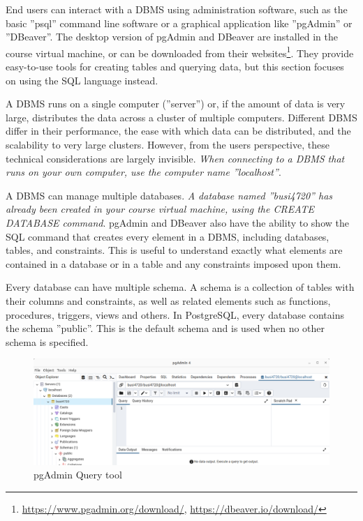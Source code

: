 End users can interact with a DBMS using administration software, such as the basic ''psql'' command line software or a graphical application like ''pgAdmin'' or ''DBeaver''. The desktop version of pgAdmin and DBeaver are installed in the course virtual machine, or can be downloaded from their websites\footnote{\url{https://www.pgadmin.org/download/}, \url{https://dbeaver.io/download/}}. They provide easy-to-use tools for creating tables and querying data, but this section focuses on using the SQL language instead.

A DBMS runs on a single computer (''server'') or, if the amount of data is very large, distributes the data across a cluster of multiple computers. Different DBMS differ in their performance, the ease with which data can be distributed, and the scalability to very large clusters. However, from the users perspective, these technical considerations are largely invisible. \emph{When connecting to a DBMS that runs on your own computer, use the computer name ''localhost''}.

A DBMS can manage multiple databases. \emph{A database named ''busi4720'' has already been created in your course virtual machine, using the CREATE DATABASE command}. pgAdmin and DBeaver also have the ability to show the SQL command that creates every element in a DBMS, including databases, tables, and constraints. This is useful to understand exactly what elements are contained in a database or in a table and any constraints imposed upon them.

Every database can have multiple schema. A schema is a collection of tables with their columns and constraints, as well as related elements such as functions, procedures, triggers, views and others. In PostgreSQL, every database contains the schema ''public''. This is the default schema and is used when no other schema is specified. 

\begin{figure}
\centering
\includegraphics[width=.9\textwidth]{screen2.png}
\caption{pgAdmin Query tool}
\label{fig:querytool}
\end{figure}

